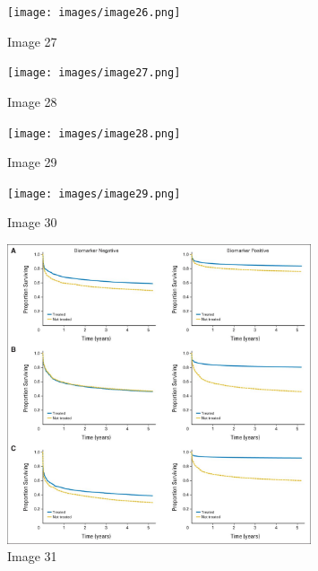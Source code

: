 \documentclass{article}%
\begin{document}
%


\begin{figure}[h!]%
\centering%
\texttt{[image: images/image26.png]}%
\caption{Image 27}%
\end{figure}

%


\begin{figure}[h!]%
\centering%
\texttt{[image: images/image27.png]}%
\caption{Image 28}%
\end{figure}

%


\begin{figure}[h!]%
\centering%
\texttt{[image: images/image28.png]}%
\caption{Image 29}%
\end{figure}

%


\begin{figure}[h!]%
\centering%
\texttt{[image: images/image29.png]}%
\caption{Image 30}%
\end{figure}

%


\begin{figure}[h!]%
\centering%
\includegraphics[width=0.8\textwidth]{images/image30.png}%
\caption{Image 31}%
\end{figure}

%
\end{document}
